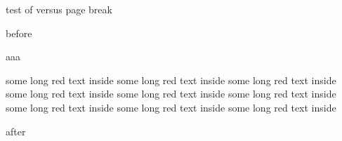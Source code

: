 \documentclass[a4paper]{article}
\begin{document}

\noindent\hrulefill test of \string\color\space versus page break\hrulefill

\vspace{18cm}

before

\def\colorframedbordercolorcommand{\color{green}}
\begin{framed}

aaa

\color{red}

some long red text inside
some long red text inside
some long red text inside
some long red text inside
some long red text inside
some long red text inside
some long red text inside
some long red text inside
some long red text inside
\end{framed}

after
\end{document}
